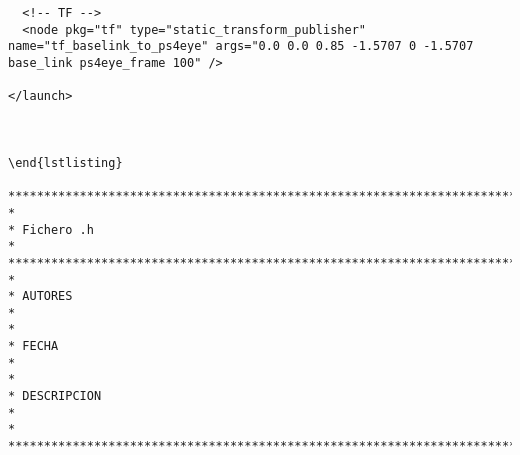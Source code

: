 \begin{center}
\begin{footnotesize}
\begin{verbatim}
  <!-- TF -->
  <node pkg="tf" type="static_transform_publisher" name="tf_baselink_to_ps4eye" args="0.0 0.0 0.85 -1.5707 0 -1.5707 base_link ps4eye_frame 100" />

</launch>



\end{lstlisting}

***********************************************************************************
*
* Fichero .h
*
***********************************************************************************
*
* AUTORES
*   
*
* FECHA
*   
*
* DESCRIPCION
*   
*
************************************************************************************/

\end{verbatim}
\end{footnotesize}
\end{center}